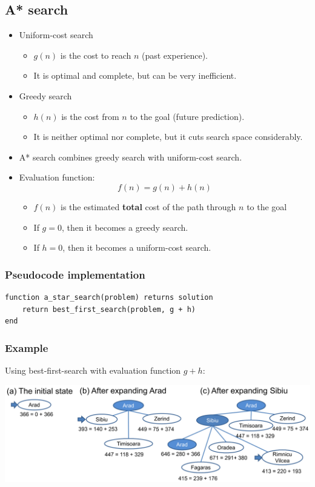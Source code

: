 \documentclass[11pt]{article}
\begin{document}
\subsection{A* search}
\label{sec:org28f7515}
\begin{itemize}
\item Uniform-cost search
\begin{itemize}
\item \(g(n)\) is the cost to reach \(n\) (past experience).
\item It is optimal and complete, but can be very inefficient.
\end{itemize}
\item Greedy search
\begin{itemize}
\item \(h(n)\) is the cost from \(n\) to the goal (future prediction).
\item It is neither optimal nor complete, but it cuts search space considerably.
\end{itemize}
\item A* search combines greedy search with uniform-cost search.
\item Evaluation function:
\[f(n) = g(n) + h(n)\]

\begin{itemize}
\item \(f(n)\) is the estimated \textbf{total} cost of the path through \(n\) to the goal
\item If \(g = 0\), then it becomes a greedy search.
\item If \(h = 0\), then it becomes a uniform-cost search.
\end{itemize}
\end{itemize}
\subsubsection{Pseudocode implementation}
\label{sec:org9c97543}
\begin{verbatim}
function a_star_search(problem) returns solution
    return best_first_search(problem, g + h)
end
\end{verbatim}

 \newpage
\subsubsection{Example}
\label{sec:org9f2a291}
Using best-first-search with evaluation function \(g + h\):

\begin{center}
\includegraphics[width=.9\linewidth]{./images/a-star-search-example-first-three-steps-diagram.png}
\end{center}
\end{document}
